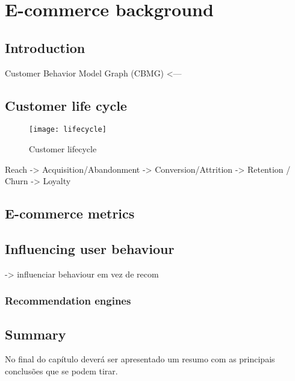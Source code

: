 \chapter{E-commerce background} \label{chap:ecommerce}

\section*{}



\section{Introduction}

Customer Behavior Model Graph (CBMG) <---

\section{Customer life cycle}

\begin{figure}[h]
  \begin{center}
    \leavevmode
    \texttt{[image: lifecycle]}
    \caption{Customer lifecycle \cite{Sterne2000}}
    \label{fig:lifecycle}
  \end{center}
\end{figure}

Reach -> Acquisition/Abandonment -> Conversion/Attrition -> Retention / Churn -> Loyalty

\section{E-commerce metrics}

\cite{Sterne2000}

\section{Influencing user behaviour}

-> influenciar behaviour em vez de recom

\subsection{Recommendation engines}

\cite{Adomavicius2005}

\section{Summary}

No final do capítulo deverá ser apresentado um resumo com as 
principais conclusões que se podem tirar. 
